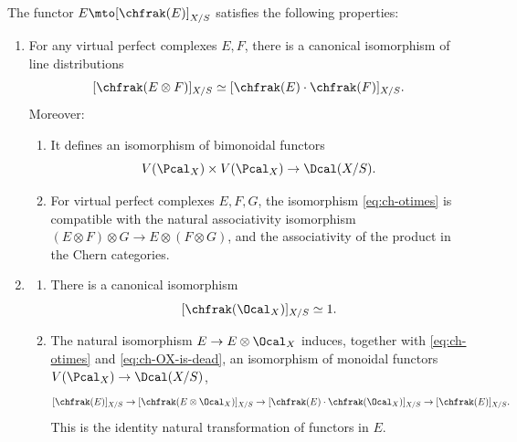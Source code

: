 \begin{proposition}\label{prop:ch-multiplicative-properties}
The functor $E\mto[\chfrak(E)]_{X/S}$ satisfies the following properties:
\begin{enumerate}
\item\label{item:chernsequence-5} For any virtual perfect complexes $E, F$, there is a canonical isomorphism of line distributions
\begin{equation}\label{eq:ch-otimes}
[\chfrak(E \otimes F)]_{X/S} \simeq [\chfrak(E) \cdot \chfrak(F)]_{X/S}.
\end{equation}
Moreover:
\begin{enumerate}
\item\label{eq:ch-otimes-a} It defines an isomorphism of bimonoidal functors
\[
V(\Pcal_{X})\times V(\Pcal_{X})\to\Dcal(X/S).
\]
\item For virtual perfect complexes $E,F,G$, the isomorphism \eqref{eq:ch-otimes} is compatible with the natural associativity isomorphism $(E\otimes F)\otimes G\to E\otimes (F\otimes G)$, and the associativity of the product in the Chern categories.
\end{enumerate}

\item \label{item:ch-is-the-unit}
\begin{enumerate}
\item\label{item:ch-acts-trivially} There is a canonical isomorphism
\begin{equation}\label{eq:ch-OX-is-dead}
[ \chfrak(\Ocal_{X}) ]_{X/S} \simeq 1.
\end{equation}
\item The natural isomorphism $E \to E \otimes \Ocal_X$ induces, together with \eqref{eq:ch-otimes} and \eqref{eq:ch-OX-is-dead}, an isomorphism of monoidal functors $V(\Pcal_X) \to \Dcal(X/S)$,
\begin{equation}\label{eq:OX-not-dead-yet}
[ \chfrak(E) ]_{X/S} \to [ \chfrak(E \otimes \Ocal_X) ]_{X/S} \to [\chfrak(E)\cdot \chfrak(\Ocal_X) ]_{X/S} \to [\chfrak(E)]_{X/S}.
\end{equation}
This is the identity natural transformation of functors in $E$.
\end{enumerate}

\end{enumerate}
\end{proposition}
